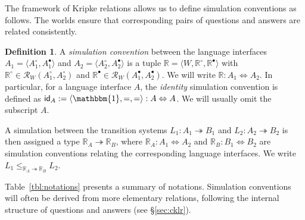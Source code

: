 \documentclass[draft,11pt]{report}
\theoremstyle{definition}
\newtheorem{definition}[theorem]{Definition}
\newcommand{\kw}[1]{\ensuremath{ \mathsf{#1} }}
\newcommand{\que}{\circ}         %
\newcommand{\ans}{\bullet}       %
\begin{document}
The framework of Kripke relations allows us
to define simulation conventions as follows.
The worlds ensure that corresponding pairs of
questions and answers are related consistently.

\begin{definition} \label{def:simconv} %
A \emph{simulation convention} between the language interfaces
$A_1 = \langle A_1^\que, A_1^\ans \rangle$ and
$A_2 = \langle A_2^\que, A_2^\ans \rangle$
is a tuple $\mathbb{R} = \langle W, \mathbb{R}^\que, \mathbb{R}^\ans \rangle$
with $\mathbb{R}^\que \in \mathcal{R}_W(A_1^\que, A_2^\que)$
and $\mathbb{R}^\ans \in \mathcal{R}_W(A_1^\ans, A_2^\ans)$.
We will write $\mathbb{R} : A_1 \Leftrightarrow A_2$.
In particular,
for a language interface $A$,
the \emph{identity} simulation convention
is defined as
$\kw{id}_A := \langle \mathbbm{1}, {=}, {=} \rangle
  : A \Leftrightarrow A$.
We will usually omit the subscript $A$.
\end{definition}

A simulation between the transition systems
$L_1 : A_1 \twoheadrightarrow B_1$ and
$L_2 : A_2 \twoheadrightarrow B_2$
is then assigned a type $\mathbb{R}_A \twoheadrightarrow \mathbb{R}_B$,
where %
$\mathbb{R}_A : A_1 \Leftrightarrow A_2$ and
$\mathbb{R}_B : B_1 \Leftrightarrow B_2$
are simulation conventions
relating the corresponding language interfaces.
We write
$L_1 \le_{\mathbb{R}_A \twoheadrightarrow \mathbb{R}_B} L_2$.

Table~\ref{tbl:notations} presents a summary of notations.
Simulation conventions
will often be derived from
more elementary relations,
following the internal structure of questions and answers
(see \S\ref{sec:cklr}).
\end{document}
